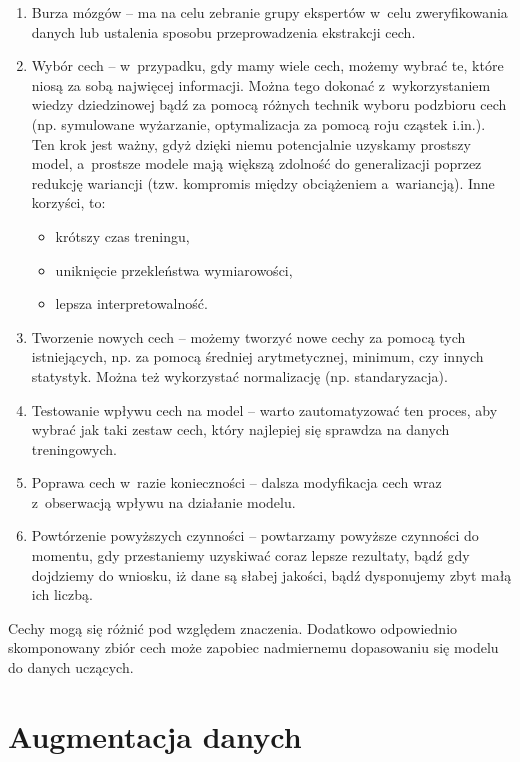 \begin{enumerate}
	\item Burza mózgów – ma na celu zebranie grupy ekspertów w~celu zweryfikowania danych lub ustalenia sposobu przeprowadzenia ekstrakcji cech.

	\item Wybór cech – w~przypadku, gdy mamy wiele cech, możemy wybrać te, które niosą za sobą najwięcej informacji. Można tego dokonać z~wykorzystaniem wiedzy dziedzinowej bądź za pomocą różnych technik wyboru podzbioru cech (np. symulowane wyżarzanie, optymalizacja za pomocą roju cząstek i.in.). Ten krok jest ważny, gdyż dzięki niemu potencjalnie uzyskamy prostszy model, a~prostsze modele mają większą zdolność do generalizacji poprzez redukcję wariancji (tzw. kompromis między obciążeniem a~wariancją). Inne korzyści, to:
	\begin{itemize}
	\item
	krótszy czas treningu,

	\item
	uniknięcie przekleństwa wymiarowości,

	\item
	lepsza interpretowalność.
	\end{itemize}
	\item Tworzenie nowych cech – możemy tworzyć nowe cechy za pomocą tych istniejących, np. za pomocą średniej arytmetycznej, minimum, czy innych statystyk. Można też wykorzystać normalizację (np. standaryzacja).

	\item Testowanie wpływu cech na model – warto zautomatyzować ten proces, aby wybrać jak taki zestaw cech, który najlepiej się sprawdza na danych treningowych.

	\item Poprawa cech w~razie konieczności – dalsza modyfikacja cech wraz z~obserwacją wpływu na działanie modelu.

	\item Powtórzenie powyższych czynności – powtarzamy powyższe czynności do momentu, gdy przestaniemy uzyskiwać coraz lepsze rezultaty, bądź gdy dojdziemy do wniosku, iż dane są słabej jakości, bądź dysponujemy zbyt małą ich liczbą.
\end{enumerate}

\noindent Cechy mogą się różnić pod względem znaczenia. Dodatkowo odpowiednio skomponowany zbiór cech może zapobiec nadmiernemu dopasowaniu się modelu do danych uczących. 

\section{Augmentacja danych}
\label{cha:cha3.4}

